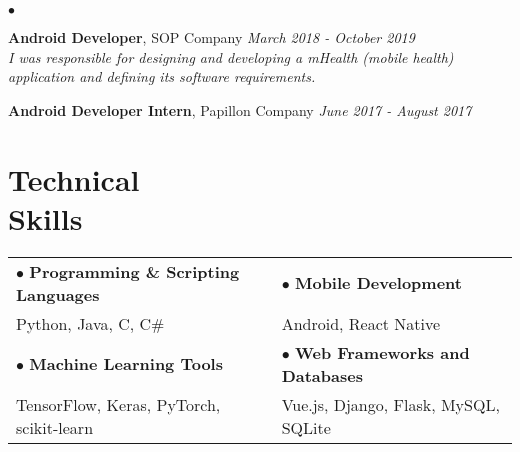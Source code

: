 \documentclass[margin,line]{res}
\newenvironment{list2}{
\begin{list}{$\bullet$}{
		\setlength{\itemsep}{0in}
		\setlength{\parsep}{0in} \setlength{\parskip}{0in}
		\setlength{\topsep}{0in} \setlength{\partopsep}{0in} 
		\setlength{\leftmargin}{0.2in}}}{\end{list}}
\begin{document}
\begin{resume}
\begin{list2}
		\item \textbf{Android Developer}, SOP Company \hfill \sl{\textit{March 2018 - October 2019}} \\
		I was responsible for designing and developing a mHealth (mobile health) application and defining its software requirements.
		\vspace{0.05in}
		
		\item \textbf{Android Developer Intern}, Papillon Company \hfill \sl{\textit{June 2017 - August 2017}} 
	\end{list2}
	\section{\sc Technical \\ Skills} 
	\hspace{0.03in}
	\begin{tabular}{@{}p{8cm}p{8cm}}
		$\bullet$ \textbf{Programming \& Scripting Languages} &  $\bullet$ \textbf{Mobile Development} \\
		\hspace{0.07in} Python, Java, C, C\# & \hspace{0.07in} Android, React Native \\
		$\bullet$ \textbf{Machine Learning Tools} & $\bullet$ \textbf{Web Frameworks and Databases}\\
		\hspace{0.07in} TensorFlow, Keras, PyTorch, scikit-learn & \hspace{0.07in} Vue.js, Django, Flask, MySQL, SQLite
	\end{tabular}
	

\end{resume}
\end{document}

